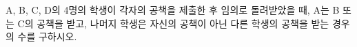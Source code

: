 A, B, C, D의 4명의 학생이 각자의 공책을 제출한 후 임의로 돌려받았을 때, A는 B 또는 C의 공책을 받고, 나머지 학생은 자신의 공책이 아닌 다른 학생의 공책을 받는 경우의 수를 구하시오.
